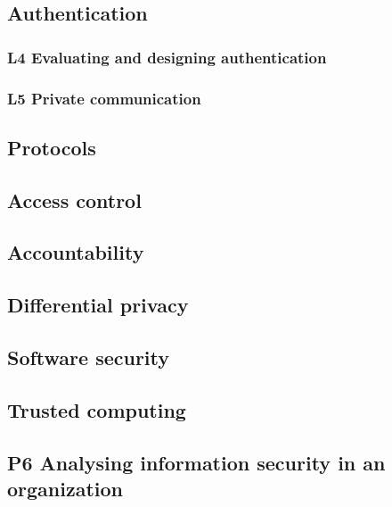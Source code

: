 {\subsection{Authentication}%
\label{authentication}


\subsubsection{L4 Evaluating and designing authentication}%
\label{pwdeval}


\subsubsection{L5 Private communication}%
\label{pricomlab}


\subsection{Protocols}%
\label{protocols}


\subsection{Access control}%
\label{ac}


\subsection{Accountability}%
\label{accountability}


\subsection{Differential privacy}%
\label{diffpriv}


\subsection{Software security}%
\label{software}


\subsection{Trusted computing}%
\label{trustcomp}


\subsection{P6 Analysing information security in an organization}%
\label{gapproject}

} %


